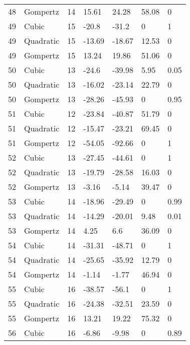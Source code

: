 \documentclass[11pt]{article}
\begin{document}
\begin{center}
\begin{longtable}{lllllll}
    48  & Gompertz  & 14              & 15.61   & 24.28   & 58.08   & 0    \\
    49  & Cubic     & 15              & -20.8   & -31.2   & 0       & 1    \\
    49  & Quadratic & 15              & -13.69  & -18.67  & 12.53   & 0    \\
    49  & Gompertz  & 15              & 13.24   & 19.86   & 51.06   & 0    \\
    50  & Cubic     & 13              & -24.6   & -39.98  & 5.95    & 0.05 \\
    50  & Quadratic & 13              & -16.02  & -23.14  & 22.79   & 0    \\
    50  & Gompertz  & 13              & -28.26  & -45.93  & 0       & 0.95 \\
    51  & Cubic     & 12              & -23.84  & -40.87  & 51.79   & 0    \\
    51  & Quadratic & 12              & -15.47  & -23.21  & 69.45   & 0    \\
    51  & Gompertz  & 12              & -54.05  & -92.66  & 0       & 1    \\
    52  & Cubic     & 13              & -27.45  & -44.61  & 0       & 1    \\
    52  & Quadratic & 13              & -19.79  & -28.58  & 16.03   & 0    \\
    52  & Gompertz  & 13              & -3.16   & -5.14   & 39.47   & 0    \\
    53  & Cubic     & 14              & -18.96  & -29.49  & 0       & 0.99 \\
    53  & Quadratic & 14              & -14.29  & -20.01  & 9.48    & 0.01 \\
    53  & Gompertz  & 14              & 4.25    & 6.6     & 36.09   & 0    \\
    54  & Cubic     & 14              & -31.31  & -48.71  & 0       & 1    \\
    54  & Quadratic & 14              & -25.65  & -35.92  & 12.79   & 0    \\
    54  & Gompertz  & 14              & -1.14   & -1.77   & 46.94   & 0    \\
    55  & Cubic     & 16              & -38.57  & -56.1   & 0       & 1    \\
    55  & Quadratic & 16              & -24.38  & -32.51  & 23.59   & 0    \\
    55  & Gompertz  & 16              & 13.21   & 19.22   & 75.32   & 0    \\
    56  & Cubic     & 16              & -6.86   & -9.98   & 0       & 0.89 \\

\end{longtable}
\end{center}
\end{document}
